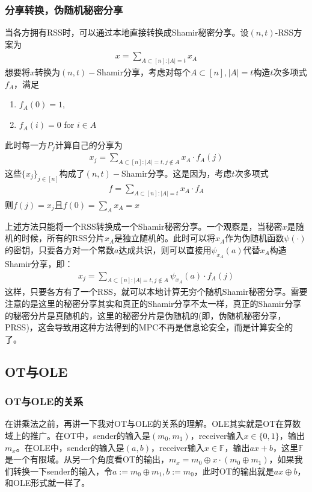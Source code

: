 \documentclass[UTF8]{ctexart}
\theoremstyle{nonumberplain}
\theoremstyle{plain}
\begin{document}
\subsubsection{分享转换，伪随机秘密分享}
当各方拥有RSS时，可以通过本地直接转换成Shamir秘密分享。设$(n,t)$-RSS方案为
\begin{align*}
x=\sum_{A\subset [n]:|A|=t}x_A
\end{align*}
想要将$x$转换为$(n,t)-$Shamir分享，考虑对每个$A\subset [n],|A|=t$构造$t$次多项式$f_A$，满足\begin{enumerate}\item $f_A(0)=1$,\item $f_A(i)=0$ for $i\in A$\end{enumerate}
此时每一方$P_j$计算自己的分享为
\begin{align*}
x_j=\sum_{A\subset [n]:|A|=t,j\notin A}x_A\cdot f_A(j)
\end{align*}
这些$\{x_j\}_{j\in [n]}$构成了$(n,t)-$Shamir分享。这是因为，考虑$t$次多项式\begin{align*}
f=\sum_{A\subset [n]:|A|=t}x_A\cdot f_A
\end{align*}
则$f(j)=x_j$且$f(0)=\sum_A x_A=x$

上述方法只能将一个RSS转换成一个Shamir秘密分享。一个观察是，当秘密$x$是随机的时候，所有的RSS分片$x_A$是独立随机的。此时可以将$x_A$作为伪随机函数$\psi(\cdot)$的密钥，只要各方对一个常数$a$达成共识，则可以直接用$\psi_{x_A}(a)$代替$x_A$构造Shamir分享，即：
\begin{align*}
x_j=\sum_{A\subset [n]:|A|=t,j\notin A}\psi_{x_A}(a)\cdot f_A(j)
\end{align*}
这样，只要各方有了一个RSS，就可以本地计算无穷个随机Shamir秘密分享。需要注意的是这里的秘密分享其实和真正的Shamir分享不太一样，真正的Shamir分享的秘密分片是真随机的，这里的秘密分片是伪随机的(即，伪随机秘密分享，PRSS)，这会导致用这种方法得到的MPC不再是信息论安全，而是计算安全的了。
\subsection{OT与OLE}
\subsubsection{OT与OLE的关系}
在讲乘法之前，再讲一下我对OT与OLE的关系的理解。OLE其实就是OT在算数域上的推广。在OT中，sender的输入是$(m_0,m_1)$，receiver输入$x\in \{0,1\}$，输出$m_x$。在OLE中，sender的输入是$(a,b)$，receiver输入$x\in \mathbb{F}$，输出$ax+b$，这里$\mathbb{F}$是一个有限域。从另一个角度看OT的输出，$m_x=m_0\oplus x\cdot(m_0\oplus m_1)$，如果我们转换一下sender的输入，令$a:=m_0\oplus m_1,b:=m_0$，此时OT的输出就是$ax\oplus b$，和OLE形式就一样了。
\end{document}
